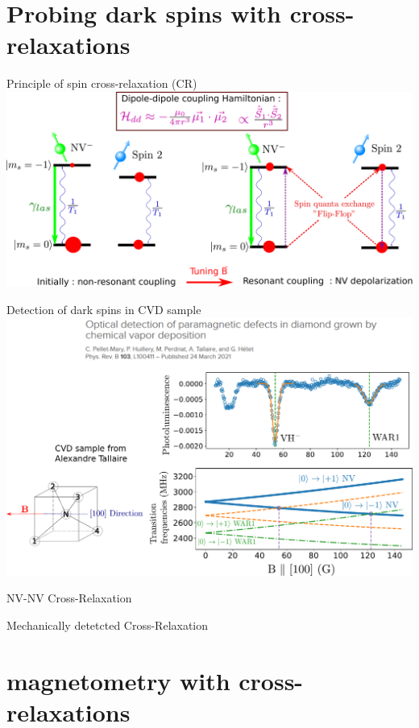 \documentclass{beamer}
\begin{document}
\section{Probing dark spins with cross-relaxations}
\begin{frame}{Principle of spin cross-relaxation (CR)}
\centering
\includegraphics[scale=.23]{Slide_CR}
\end{frame}
\begin{frame}{Detection of dark spins in CVD sample}
\centering
\includegraphics[scale=.35]{Slide_CR_CVD}
\end{frame}
\begin{frame}{NV-NV Cross-Relaxation}
\end{frame}
\begin{frame}{Mechanically detetcted Cross-Relaxation}
\end{frame}
\section{magnetometry with cross-relaxations}
\end{document}
